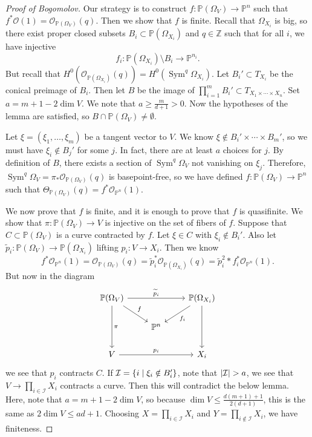\documentclass[leqno, openany]{memoir}
\theoremstyle{definition}
\theoremstyle{remark}
\theoremstyle{plain}
\theoremstyle{definition}
\theoremstyle{remark}
\newcommand{\Z}{\mathbb{Z}}
\renewcommand{\P}{\mathbb{P}}
\newcommand{\mc}[1]{\mathcal{#1}}
\newcommand{\on}[1]{\operatorname{#1}}
\newcommand{\wt}[1]{\widetilde{#1}}
\begin{document}
\begin{proof}[Proof of Bogomolov]
    Our strategy is to construct $f \colon \P(\Omega_V) \to \P^n$ such that $f^* \mc{O}(1) = \mc{O}_{\P(\Omega_V)}(q)$. Then we show that $f$ is finite. Recall that $\Omega_{X_i}$ is big, so there exist proper closed subsets $B_i \subset \P(\Omega_{X_i})$ and $q \in \Z$ such that for all $i$, we have injective
    \[ f_i \colon \P(\Omega_{X_i}) \setminus B_i \to \P^{n_i}. \]
    But recall that $H^0(\mc{O}_{\P(\Omega_{X_i})}(q)) = H^0(\on{Sym}^q \Omega_{X_i})$. Let $B_i' \subset T_{X_i}$ be the conical preimage of $B_i$. Then let $B$ be the image of $\prod_{i=1}^m B_i' \subset T_{X_1 \times \cdots \times X_n}$. Set $a = m+1 - 2 \dim V$. We note that $a \geq \frac{m}{d+1} > 0$. Now the hypotheses of the lemma are satisfied, so $B \cap \P(\Omega_V) \neq \emptyset$. 

    Let $\xi = (\xi_1, \ldots, \xi_m)$ be a tangent vector to $V$. We know $\xi \notin B_i' \times \cdots \times B_m'$, so we must have $\xi_i \notin B_j'$ for some $j$. In fact, there are at least $a$ choices for $j$.  By definition of $B$, there exists a section of $\on{Sym}^q \Omega_V$ not vanishing on $\xi_j$. Therefore, $\on{Sym}^q \Omega_V = \pi_* \mc{O}_{\P(\Omega_V)}(q)$ is basepoint-free, so we have defined $f \colon \P(\Omega_V) \to \P^n$ such that $\Theta_{\P(\Omega_V)}(q) = f^* \mc{O}_{\P^n}(1)$.

    We now prove that $f$ is finite, and it is enough to prove that $f$ is quasifinite. We show that $\pi \colon \P(\Omega_V) \to V$ is injective on the set of fibers of $f$. Suppose that $C \subset \P(\Omega_V)$ is a curve contracted by $f$. Let $\xi \in C$ with $\xi_i \notin B_i'$. Also let $\wt{p}_i \colon \P(\Omega_V) \to \P(\Omega_{X_i})$ lifting $p_i \colon V \to X_i$. Then we know
    \[ f^* \mc{O}_{\P^n}(1) = \mc{O}_{\P(\Omega_V)}(q) = \wt{p}_i^* \mc{O}_{\P(\Omega_{X_i})}(q) = \wt{p}_i^2*f_i^* \mc{O}_{\P^n}(1). \]
    But now in the diagram
    \begin{equation*}
    \begin{tikzcd}
        \P(\Omega_V) \ar{rr}{\wt{p}_i} \ar{dr}{f} \ar{dd}{\pi} & & \P(\Omega_{X_i}) \ar{dd} \ar{dl}{f_i} \\
        & \P^n \\
        V \ar{rr}{p_i} & & X_i
    \end{tikzcd}
    \end{equation*}
    we see that $p_i$ contracts $C$. If $\mc{I} = \qty{i \mid \xi_i \notin B_i'}$, note that $\abs{\mc{I}} > a$, we see that $V \to \prod_{i \in \mc{I}} X_i$ contracts a curve. Then this will contradict the below lemma. Here, note that $a = m+1 - 2 \dim V$, so because $\dim V \leq \frac{d(m+1)+1}{2(d+1)}$, this is the same as $2 \dim V \leq ad+1$. Choosing $X = \prod_{i \in \mc{I}} X_i$ and $Y = \prod_{i \notin \mc{I}} X_i$, we have finiteness.
\end{proof}
\end{document}
